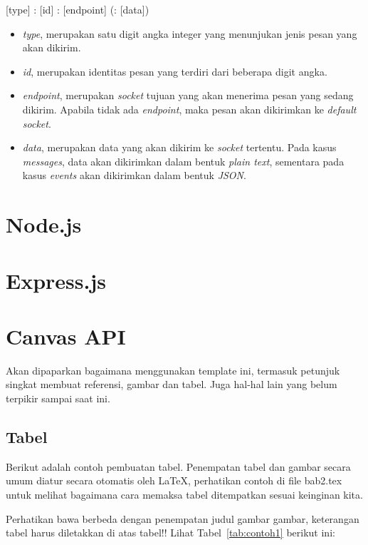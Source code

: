 [type] : [id] : [endpoint] (: [data])

\begin{itemize}
	\item \textit{type}, merupakan satu digit angka integer yang menunjukan jenis pesan yang akan dikirim.
	\item \textit{id}, merupakan identitas pesan yang terdiri dari beberapa digit angka.
	\item \textit{endpoint}, merupakan \textit{socket} tujuan yang akan menerima pesan yang sedang dikirim. Apabila tidak ada \textit{endpoint}, maka pesan akan dikirimkan ke \textit{default socket}.
	\item \textit{data}, merupakan data yang akan dikirim ke \textit{socket} tertentu. Pada kasus \textit{messages}, data akan dikirimkan dalam bentuk \textit{plain text}, sementara pada kasus \textit{events} akan dikirimkan dalam bentuk \textit{JSON}.
\end{itemize}

\section{Node.js}
\label{sec:Node.js}




\section{Express.js}
\label{sec:Express.js}

\section{Canvas API}
\label{sec:Canvas API}
 
Akan dipaparkan bagaimana menggunakan template ini, termasuk petunjuk singkat membuat referensi, gambar dan tabel.
Juga hal-hal lain yang belum terpikir sampai saat ini. 
 

\subsection{Tabel}  
Berikut adalah contoh pembuatan tabel. 
Penempatan tabel dan gambar secara umum diatur secara otomatis oleh \LaTeX{}, perhatikan contoh di file bab2.tex untuk melihat bagaimana cara memaksa tabel ditempatkan sesuai keinginan kita.

Perhatikan bawa berbeda dengan penempatan judul gambar gambar, keterangan tabel harus diletakkan di atas tabel!!
Lihat Tabel~\ref{tab:contoh1} berikut ini:

